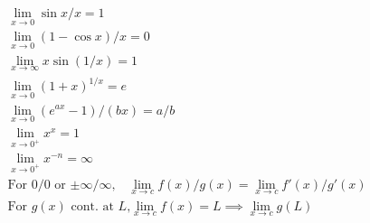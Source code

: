 \documentclass{mathnotes-formula-sheet}
\begin{document}
\begin{gather*}
  \lim_{x \to 0} \sin x/x = 1 \\
  \lim_{x \to 0} (1-\cos x)/x = 0 \\
  \lim_{x \to \infty} x \sin(1/x) = 1 \\
  \lim_{x \to 0} (1+x)^{1/x} = e \\
  \lim_{x \to 0} (e^{ax}-1)/(bx) = a/b \\
  \lim_{x \to 0^+} x^x = 1 \\
  \lim_{x \to 0^+} x^{-n} = \infty \\
  \text{For $0/0$ or $\pm\infty/\infty$,}\quad
  \lim_{x \to c} f(x)/g(x) = \lim_{x \to c} f'(x)/g'(x) \\
  \text{For $g(x)$ cont.\ at $L$,}
  \lim_{x \to c} f(x) = L \implies \lim_{x \to c} g(L)
\end{gather*}
\end{document}
